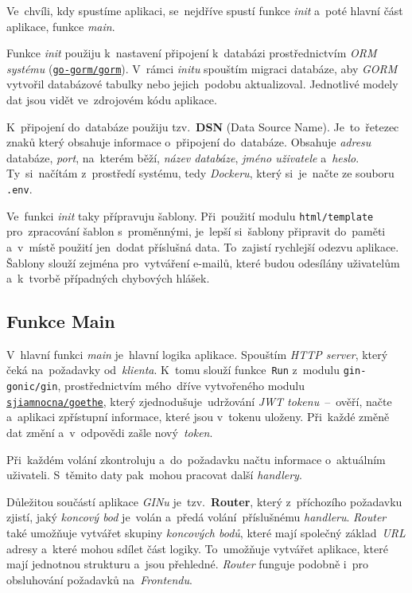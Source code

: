 \documentclass[11pt,a4paper]{report}
\begin{document}
            Ve~chvíli, kdy spustíme aplikaci, se~nejdříve spustí funkce \emph{init} a~poté hlavní část aplikace, funkce \emph{main}.
            
            Funkce \emph{init} použiju k~nastavení připojení k~databázi prostřednictvím \emph{ORM systému} (\href{https://gorm.io/}{\texttt{go-gorm/gorm}}). V~rámci \emph{initu} spouštím migraci databáze, aby \emph{GORM} vytvořil databázové tabulky nebo jejich~podobu aktualizoval. Jednotlivé modely dat jsou vidět ve~zdrojovém kódu aplikace.

            K~připojení do~databáze použiju tzv.~\textbf{DSN} (Data Source Name). Je~to~řetezec znaků který obsahuje informace o~připojení do~databáze. Obsahuje \emph{adresu} databáze, \emph{port}, na~kterém běží, \emph{název databáze}, \emph{jméno uživatele} a~\emph{heslo}. Ty~si~načítám z~prostředí systému, tedy \emph{Dockeru}, který si~je~načte ze souboru \texttt{.env}.

            Ve~funkci \emph{init} taky přípravuju šablony. Při~použití modulu \texttt{html/template} pro~zpracování šablon s~proměnnými, je~lepší si~šablony připravit do~paměti a~v~místě použití jen~dodat příslušná data. To~zajistí rychlejší odezvu aplikace. Šablony slouží zejména pro~vytváření e-mailů, které budou odesílány uživatelům a~k~tvorbě případných chybových hlášek.

        \subsection{Funkce Main}
            V~hlavní funkci \emph{main} je~hlavní logika aplikace. Spouštím \emph{HTTP server}, který čeká na~požadavky od~\emph{klienta}. K~tomu slouží funkce~\texttt{Run} z~modulu \texttt{gin-gonic/gin}, prostřednictvím mého~dříve vytvořeného modulu \href{https://gitlab.com/sjiamnocna/goethe}{\texttt{sjiamnocna/goethe}}, který zjednodušuje~udržování \emph{JWT tokenu}~--~ověří, načte a~aplikaci zpřístupní informace, které jsou v~tokenu uloženy. Při~každé změně dat změní a~v~odpovědi zašle nový~\emph{token}.
            
            Při~každém volání zkontroluju a~do~požadavku načtu informace o~aktuálním uživateli. S~těmito daty pak~mohou pracovat další \emph{handlery}.

            Důležitou součástí aplikace \emph{GINu} je~tzv.~\textbf{Router}, který z~příchozího požadavku zjistí, jaký \emph{koncový bod} je~volán a~předá volání~příslušnému \emph{handleru}. \emph{Router} také umožňuje vytvářet skupiny \emph{koncových bodů}, které mají společný základ~\emph{URL} adresy a~které mohou sdílet část logiky. To~umožňuje vytvářet aplikace, které mají jednotnou strukturu a~jsou přehledné. \emph{Router} funguje podobně i~pro obsluhování požadavků na~\emph{Frontendu}.
\end{document}
